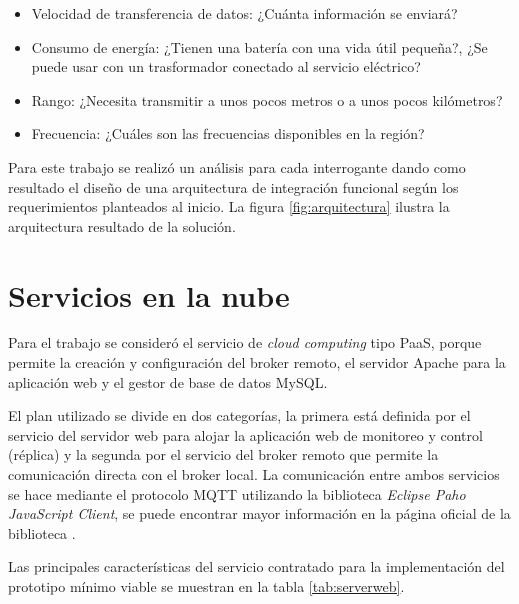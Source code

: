 \begin{itemize}
\item Velocidad de transferencia de datos: ¿Cuánta información se enviará?
\item Consumo de energía: ¿Tienen una batería con una vida útil pequeña?, ¿Se puede usar con un trasformador conectado al servicio eléctrico?
\item Rango: ¿Necesita transmitir a unos pocos metros o a unos pocos kilómetros?
\item Frecuencia: ¿Cuáles son las frecuencias disponibles en la región?
\end{itemize}

\vspace{0.5cm}

Para este trabajo se realizó un análisis para cada interrogante dando como resultado el diseño de una arquitectura de integración funcional según los requerimientos  planteados al inicio. La figura \ref{fig:arquitectura} ilustra la arquitectura resultado de la solución.

\section{Servicios en la nube}

Para el trabajo se consideró el servicio de \emph{cloud computing} tipo PaaS, porque permite la creación y configuración del broker remoto, el servidor Apache para la aplicación web y el gestor de base de datos MySQL.

El plan utilizado se divide en dos categorías, la primera está definida por el servicio del servidor web para alojar la aplicación web de monitoreo y control (réplica) y la segunda por el servicio del broker remoto que permite la comunicación directa con el broker local. La comunicación entre ambos servicios se hace mediante el protocolo MQTT utilizando la biblioteca  \emph{Eclipse Paho JavaScript Client}, se puede encontrar mayor información en la página oficial de la biblioteca \citep{WEBSITE:41}. 

Las principales características  del servicio contratado para la implementación del prototipo mínimo viable se muestran en la tabla \ref{tab:serverweb}.


